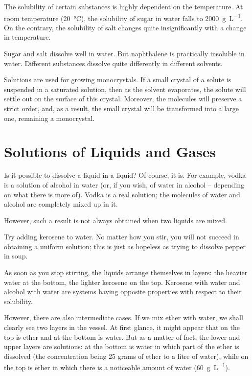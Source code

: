 The solubility of certain substances is highly dependent on the temperature. At room temperature (\SI{20}{\celsius}), the solubility of sugar in water falls to \SI{2000}{\gram\per\liter}. On the con­trary, the solubility of salt changes quite insignificantly with a change in temperature.

Sugar and salt dissolve well in water. But naphthalene is practically insoluble in water. Different substances dissolve quite differently in different solvents.

Solutions are used for growing monocrystals. If a small crystal of a solute is suspended in a saturated solution, then as the solvent evaporates, the solute will settle out on the surface of this crystal. Moreover, the molecules will preserve a strict order, and, as a result, the small crystal will be transformed into a large one, remaining a monocrystal.

\section{Solutions of Liquids and Gases}

Is it possible to dissolve a liquid in a liquid? Of course, it is. For example, vodka is a solution of alcohol in water (or, if you wish, of water in alcohol -- depending on what there is more of). Vodka is a real solution; the molecules of water and alcohol are completely mixed up in it.

However, such a result is not always obtained when two liquids are mixed.

Try adding kerosene to water. No matter how you stir, you will not succeed in obtaining a uniform solution; this is just as hopeless as trying to dissolve pepper in soup.

As soon as you stop stirring, the liquids arrange themselves in layers: the heavier water at the bottom, the lighter kerosene on the top. Kerosene with water and alcohol with water are systems having opposite properties with respect to their solubility.

However, there are also intermediate cases. If we mix ether with water, we shall clearly see two layers in the vessel. At first glance, it might appear that on the top is ether and at the bottom is water. But as a matter of fact, the lower and upper layers are solutions: at the bottom is water in which part of the ether is dissolved (the concentration being 25 grams of ether to a litre of water), while on the top is ether in which there is a noticeable amount of water (\SI{60}{\gram\per\liter}).

